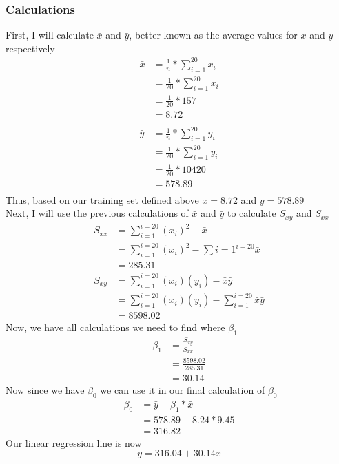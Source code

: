 \documentclass[12pt]{article}
\begin{document}
\subsubsection{Calculations}
First, I will calculate $\bar x$ and $\bar y$, better known as the average values for $x$ and $y$ respectively\\
\begin{align*}
\bar x &= \frac{1}{n} * \sum_{i=1}^{20}x_i\\
&= \frac{1}{20} * \sum_{i=1}^{20}x_i\\
&= \frac{1}{20} * 157\\
&= 8.72\\ \\
\bar y &= \frac{1}{n} * \sum_{i=1}^{20}y_i\\
&= \frac{1}{20} * \sum_{i=1}^{20}y_i\\
&= \frac{1}{20} * 10420\\
&= 578.89\\
\end{align*}
Thus, based on our training set defined above $\bar x = 8.72$ and $\bar y = 578.89$\\
Next, I will use the previous calculations of $\bar x$ and $\bar y$ to calculate $S_{xy}$ and $S_{xx}$
\begin{align*}
S_{xx} &= \sum_{i=1}^{i=20} (x_i)^2 - \bar x \\
&= \sum_{i=1}^{i=20} (x_i)^2 - \sum{i=1}^{i=20} \bar x \\
&= 285.31 \\
S_{xy} &= \sum_{i=1}^{i=20} (x_i)(y_i) - \bar x \bar y \\
&= \sum_{i=1}^{i=20} (x_i)(y_i) - \sum_{i=1}^{i=20} \bar x \bar y \\
&= 8598.02
\end{align*}
Now, we have all calculations we need to find where $\beta_{1}$
\begin{align*}
	\beta_{1} &= \frac{S_{xy}}{S_{xx}} \\
	&= \frac{8598.02}{285.31} \\
	&= 30.14
\end{align*}
Now since we have $\beta_{0}$ we can use it in our final calculation of $\beta_{0}$
\begin{align*}
	\beta_{0} &= \bar y - \beta_{1} * \bar x \\
	&= 578.89 - 8.24 * 9.45 \\
	&= 316.82
\end{align*}
Our linear regression line is now \\
\begin{equation}
	y = 316.04 + 30.14x
\end{equation}
\end{document}
